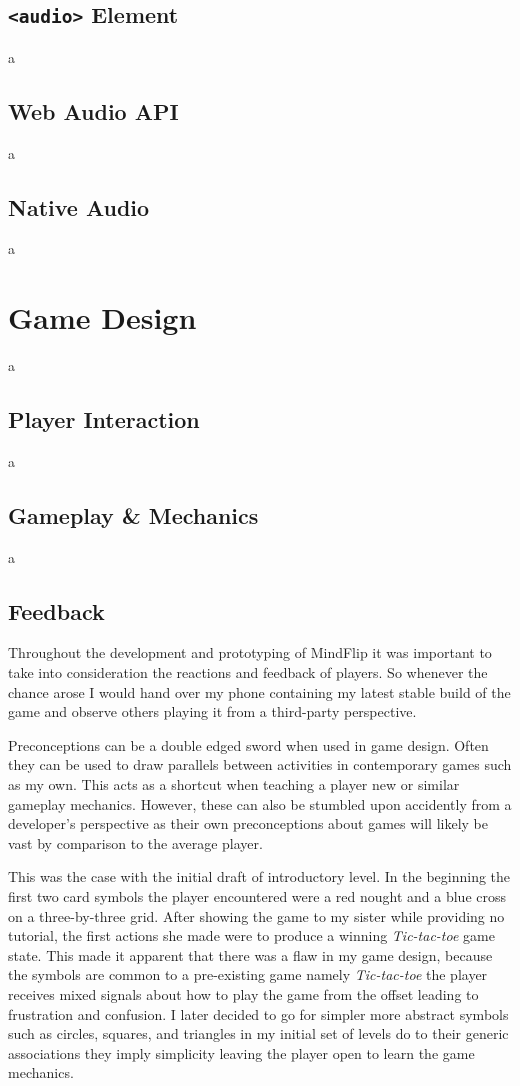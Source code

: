 \documentclass[final]{cmpreport}
\begin{document}
\subsection{\texttt{<audio>} Element}
a

\subsection{Web Audio API}
a

\subsection{Native Audio}
a

\section{Game Design}
a

\subsection{Player Interaction}
a

\subsection{Gameplay \& Mechanics}
a

\subsection{Feedback}
Throughout the development and prototyping of MindFlip it was important to take into consideration the reactions and feedback of players. So whenever the chance arose I would hand over my phone containing my latest stable build of the game and observe others playing it from a third-party perspective.

Preconceptions can be a double edged sword when used in game design. Often they can be used to draw parallels between activities in contemporary games such as my own. This acts as a shortcut when teaching a player new or similar gameplay mechanics. However, these can also be stumbled upon accidently from a developer's perspective as their own preconceptions about games will likely be vast by comparison to the average player.

This was the case with the initial draft of introductory level. In the beginning the first two card symbols the player encountered were a red nought and a blue cross on a three-by-three grid. After showing the game to my sister while providing no tutorial, the first actions she made were to produce a winning \emph{Tic-tac-toe} game state. This made it apparent that there was a flaw in my game design, because the symbols are common to a pre-existing game namely \emph{Tic-tac-toe} the player receives mixed signals about how to play the game from the offset leading to frustration and confusion. I later decided to go for simpler more abstract symbols such as circles, squares, and triangles in my initial set of levels do to their generic associations they imply simplicity leaving the player open to learn the game mechanics.
\end{document}
